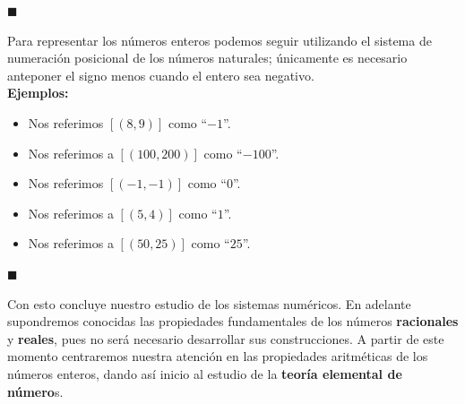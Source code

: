 \documentclass[10 pt]{article}
\begin{document}
\begin{flushright}
    $\blacksquare$
\end{flushright}

\Large{Para representar los números enteros podemos seguir utilizando el sistema de numeración posicional de los números naturales; únicamente es necesario anteponer el signo menos cuando el entero sea negativo.} \\

\Large{\textbf{Ejemplos:}} \\

\begin{itemize}
    \item \Large{Nos referimos $[(8,9)]$ como ``$-1$''.} \\

    \item \Large{Nos referimos a $[(100,200)]$ como ``$-100$''.} \\

    \item \Large{Nos referimos $[(-1,-1)]$ como ``$0$''.} \\

    \item \Large{Nos referimos a $[(5,4)]$ como ``$1$''.} \\

    \item \Large{Nos referimos a $[(50,25)]$ como ``$25$''.} \\
\end{itemize}

\begin{flushright}
    $\blacksquare$
\end{flushright}

\Large{Con esto concluye nuestro estudio de los sistemas numéricos. En adelante supondremos conocidas las propiedades fundamentales de los números \textbf{racionales} y \textbf{reales}, pues no será necesario desarrollar sus construcciones. A partir de este momento centraremos nuestra atención en las propiedades aritméticas de los números enteros, dando así inicio al estudio de la \textbf{teoría elemental de número}s.} \\
\end{document}
